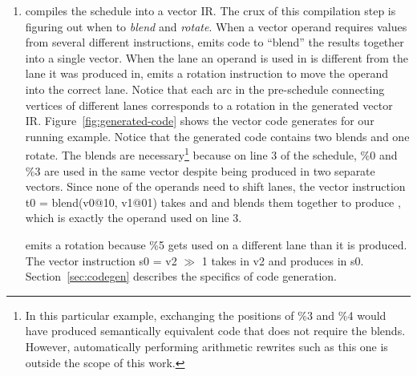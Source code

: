 \begin{enumerate}
    \item \system compiles the schedule into a vector IR. The crux of this compilation step is figuring out when to {\em blend} and {\em rotate}. When a vector operand requires values from several different instructions, \system emits code to ``blend'' the results together into a single vector.
    When the lane an operand is used in is different from the lane it was produced in, \system emits a rotation instruction to move the operand into the correct lane. Notice that each arc in the pre-schedule connecting vertices of different lanes corresponds to a rotation in the generated vector IR.
    Figure~\ref{fig:generated-code} shows the vector code \system generates for our running example.
    Notice that the generated code contains two blends and one rotate.
    The blends are necessary\footnote{In this particular example, exchanging the positions of {\sf \%3} and {\sf \%4} would have produced semantically equivalent code that does not require the blends. However, automatically performing arithmetic rewrites such as this one is outside the scope of this work.} because on line 3 of the schedule, {\sf \%0} and {\sf \%3} are used in the same vector despite being produced in two separate vectors. 
    Since none of the operands need to shift lanes, the vector instruction {\sf t0 = blend(v0@10, v1@01)} takes {\sf [\%0, \%4]} and {\sf [\%1, \%3]} and blends them together to produce {\sf [\%0, \%3]}, which is exactly the operand used on line 3. 

    \system emits a rotation because {\sf \%5} gets used on a different lane than it is produced.
    The vector instruction {\sf s0 = v2 $\gg$ 1} takes {\sf [\%2, \%5]} in {\sf v2} and produces {\sf [\%5, \%2]} in {\sf s0}.
    Section~\ref{sec:codegen} describes the specifics of code generation.
\end{enumerate}

